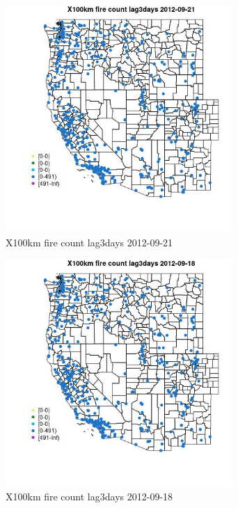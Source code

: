 \begin{figure} 
\centering  
\includegraphics[width=0.77\textwidth]{Code_Outputs/Report_ML_input_PM25_Step4_part_e_de_duplicated_aves_compiled_2019-05-14wNAs_MapObsX100km_fire_count_lag3days2012-09-21.jpg} 
\caption{\label{fig:Report_ML_input_PM25_Step4_part_e_de_duplicated_aves_compiled_2019-05-14wNAsMapObsX100km_fire_count_lag3days2012-09-21}X100km fire count lag3days 2012-09-21} 
\end{figure} 
 

\begin{figure} 
\centering  
\includegraphics[width=0.77\textwidth]{Code_Outputs/Report_ML_input_PM25_Step4_part_e_de_duplicated_aves_compiled_2019-05-14wNAs_MapObsX100km_fire_count_lag3days2012-09-18.jpg} 
\caption{\label{fig:Report_ML_input_PM25_Step4_part_e_de_duplicated_aves_compiled_2019-05-14wNAsMapObsX100km_fire_count_lag3days2012-09-18}X100km fire count lag3days 2012-09-18} 
\end{figure} 
 

